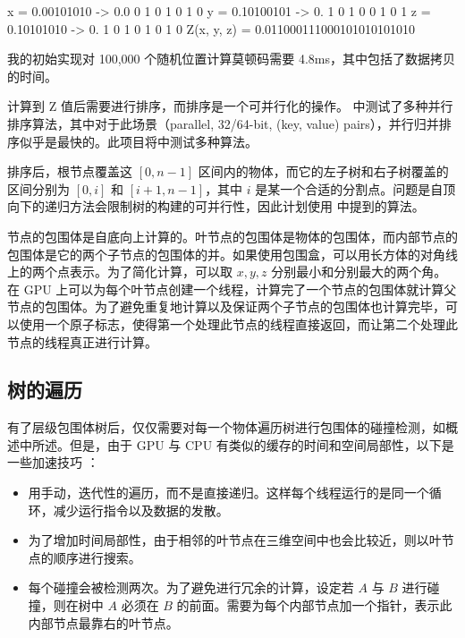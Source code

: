 \begin{codeblock}
                        x = 0.00101010 -> 0.0  0  1  0  1  0  1  0
                        y = 0.10100101 -> 0. 1  0  1  0  0  1  0  1
                        z = 0.10101010 -> 0.  1  0  1  0  1  0  1  0
                             Z(x, y, z) = 0.011000111000101010101010
\end{codeblock}

我的初始实现对 100,000 个随机位置计算莫顿码需要 4.8ms，其中包括了数据拷贝的时间。


计算到 Z 值后需要进行排序，而排序是一个可并行化的操作。\cite{sorting} 中测试了多种并行排序算法，其中对于此场景（parallel, 32/64-bit, (key, value) pairs），并行归并排序似乎是最快的。此项目将中测试多种算法。

排序后，根节点覆盖这 $[0, n-1]$ 区间内的物体，而它的左子树和右子树覆盖的区间分别为 $[0, i]$ 和 $[i+1,n-1]$，其中 $i$ 是某一个合适的分割点。问题是自顶向下的递归方法会限制树的构建的可并行性，因此计划使用 \cite{Karras2012} 中提到的算法。

节点的包围体是自底向上计算的。叶节点的包围体是物体的包围体，而内部节点的包围体是它的两个子节点的包围体的并。如果使用包围盒，可以用长方体的对角线上的两个点表示。为了简化计算，可以取 $x,y,z$ 分别最小和分别最大的两个角。在 GPU 上可以为每个叶节点创建一个线程，计算完了一个节点的包围体就计算父节点的包围体。为了避免重复地计算以及保证两个子节点的包围体也计算完毕，可以使用一个原子标志，使得第一个处理此节点的线程直接返回，而让第二个处理此节点的线程真正进行计算。

\subsection{树的遍历}

有了层级包围体树后，仅仅需要对每一个物体遍历树进行包围体的碰撞检测，如概述中所述。但是，由于 GPU 与 CPU 有类似的缓存的时间和空间局部性，以下是一些加速技巧 \cite{nvidiaTreeTraversal}：

\begin{itemize}
    \item 用手动，迭代性的遍历，而不是直接递归。这样每个线程运行的是同一个循环，减少运行指令以及数据的发散。
    \item 为了增加时间局部性，由于相邻的叶节点在三维空间中也会比较近，则以叶节点的顺序进行搜索。
    \item 每个碰撞会被检测两次。为了避免进行冗余的计算，设定若 $A$ 与 $B$ 进行碰撞，则在树中 $A$ 必须在 $B$ 的前面。需要为每个内部节点加一个指针，表示此内部节点最靠右的叶节点。
\end{itemize}

\newpage

